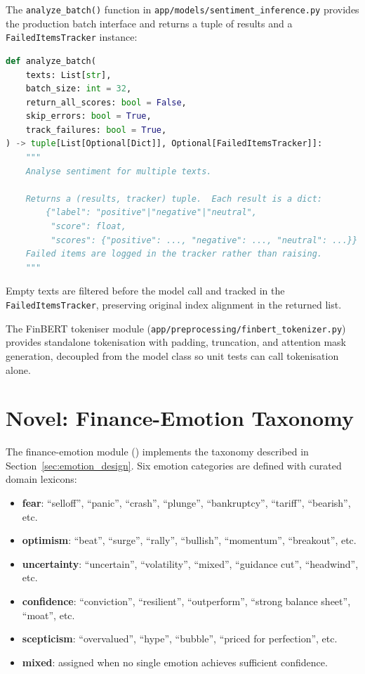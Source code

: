 The \texttt{analyze\_batch()} function in \texttt{app/models/sentiment\_inference.py} provides the production batch interface and returns a tuple of results and a \texttt{FailedItemsTracker} instance:

\noindent
\begin{minipage}{\linewidth}
\begin{lstlisting}[language=Python, caption={Production batch inference signature in \texttt{sentiment\_inference.py}.}, label={lst:batch_inference}]
def analyze_batch(
    texts: List[str],
    batch_size: int = 32,
    return_all_scores: bool = False,
    skip_errors: bool = True,
    track_failures: bool = True,
) -> tuple[List[Optional[Dict]], Optional[FailedItemsTracker]]:
    """
    Analyse sentiment for multiple texts.

    Returns a (results, tracker) tuple.  Each result is a dict:
        {"label": "positive"|"negative"|"neutral",
         "score": float,
         "scores": {"positive": ..., "negative": ..., "neutral": ...}}
    Failed items are logged in the tracker rather than raising.
    """
\end{lstlisting}
\end{minipage}

Empty texts are filtered before the model call and tracked in the \texttt{FailedItemsTracker}, preserving original index alignment in the returned list.

The FinBERT tokeniser module (\texttt{app/preprocessing/finbert\_tokenizer.py}) provides standalone tokenisation with padding, truncation, and attention mask generation, decoupled from the model class so unit tests can call tokenisation alone.

\section{Novel: Finance-Emotion Taxonomy}
\label{sec:emotion_impl}

The finance-emotion module () implements the taxonomy described in Section~\ref{sec:emotion_design}.  Six emotion categories are defined with curated domain lexicons:

\begin{itemize}
    \item \textbf{fear}: ``selloff'', ``panic'', ``crash'', ``plunge'', ``bankruptcy'', ``tariff'', ``bearish'', etc.
    \item \textbf{optimism}: ``beat'', ``surge'', ``rally'', ``bullish'', ``momentum'', ``breakout'', etc.
    \item \textbf{uncertainty}: ``uncertain'', ``volatility'', ``mixed'', ``guidance cut'', ``headwind'', etc.
    \item \textbf{confidence}: ``conviction'', ``resilient'', ``outperform'', ``strong balance sheet'', ``moat'', etc.
    \item \textbf{scepticism}: ``overvalued'', ``hype'', ``bubble'', ``priced for perfection'', etc.
    \item \textbf{mixed}: assigned when no single emotion achieves sufficient confidence.
\end{itemize}


